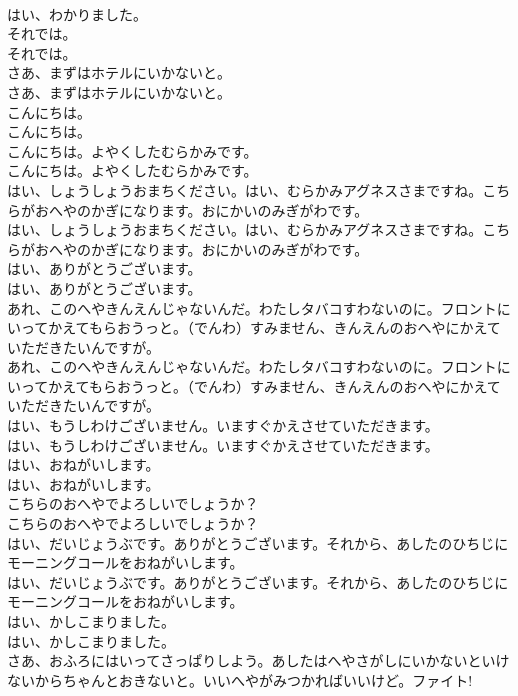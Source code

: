 \documentclass[8pt]{extreport}
\begin{document}
\begin{CJK}{UTF8}{min}
\\	はい、わかりました。
\\	それでは。
\\	それでは。
\\	さあ、まずはホテルにいかないと。
\\	さあ、まずはホテルにいかないと。
\\	こんにちは。
\\	こんにちは。
\\	こんにちは。よやくしたむらかみです。
\\	こんにちは。よやくしたむらかみです。
\\	はい、しょうしょうおまちください。はい、むらかみアグネスさまですね。こちらがおへやのかぎになります。おにかいのみぎがわです。
\\	はい、しょうしょうおまちください。はい、むらかみアグネスさまですね。こちらがおへやのかぎになります。おにかいのみぎがわです。
\\	はい、ありがとうございます。
\\	はい、ありがとうございます。
\\	あれ、このへやきんえんじゃないんだ。わたしタバコすわないのに。フロントにいってかえてもらおうっと。（でんわ）すみません、きんえんのおへやにかえていただきたいんですが。
\\	あれ、このへやきんえんじゃないんだ。わたしタバコすわないのに。フロントにいってかえてもらおうっと。（でんわ）すみません、きんえんのおへやにかえていただきたいんですが。
\\	はい、もうしわけございません。いますぐかえさせていただきます。
\\	はい、もうしわけございません。いますぐかえさせていただきます。
\\	はい、おねがいします。
\\	はい、おねがいします。
\\	こちらのおへやでよろしいでしょうか？
\\	こちらのおへやでよろしいでしょうか？
\\	はい、だいじょうぶです。ありがとうございます。それから、あしたのひちじにモーニングコールをおねがいします。
\\	はい、だいじょうぶです。ありがとうございます。それから、あしたのひちじにモーニングコールをおねがいします。
\\	はい、かしこまりました。
\\	はい、かしこまりました。
\\	さあ、おふろにはいってさっぱりしよう。あしたはへやさがしにいかないといけないからちゃんとおきないと。いいへやがみつかればいいけど。ファイト!

\end{CJK}
\end{document}

